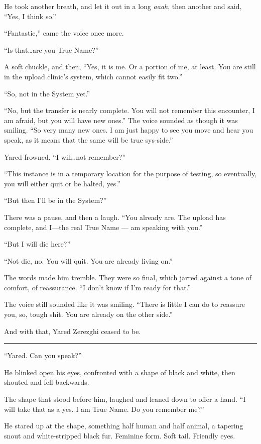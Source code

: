 He took another breath, and let it out in a long \emph{aaah}, then another and said, ``Yes, I think so.''

``Fantastic,'' came the voice once more.

``Is that\ldots are you True Name?''

A soft chuckle, and then, ``Yes, it is me. Or a portion of me, at least. You are still in the upload clinic's system, which cannot easily fit two.''

``So, not in the System yet.''

``No, but the transfer is nearly complete. You will not remember this encounter, I am afraid, but you will have new ones.'' The voice sounded as though it was smiling. ``So very many new ones. I am just happy to see you move and hear you speak, as it means that the same will be true sys-side.''

Yared frowned. ``I will..not remember?''

``This instance is in a temporary location for the purpose of testing, so eventually, you will either quit or be halted, yes.''

``But then I'll be in the System?''

There was a pause, and then a laugh. ``You already are. The upload has complete, and I---the real True Name — am speaking with you.''

``But I will die here?''

``Not die, no. You will quit. You are already living on.''

The words made him tremble. They were so final, which jarred against a tone of comfort, of reassurance. ``I don't know if I'm ready for that.''

The voice still sounded like it was smiling. ``There is little I can do to reassure you, so, tough shit. You are already on the other side.''

And with that, Yared Zerezghi ceased to be.

\begin{center}\rule{0.5\linewidth}{0.5pt}\end{center}

``Yared. Can you speak?''

He blinked open his eyes, confronted with a shape of black and white, then shouted and fell backwards.

The shape that stood before him, laughed and leaned down to offer a hand. ``I will take that as a yes. I am True Name. Do you remember me?''

He stared up at the shape, something half human and half animal, a tapering snout and white-stripped black fur. Feminine form. Soft tail. Friendly eyes.

